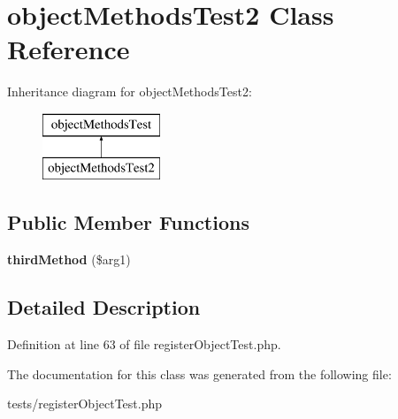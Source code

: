 \hypertarget{classobjectMethodsTest2}{
\section{objectMethodsTest2 Class Reference}
\label{classobjectMethodsTest2}
}
Inheritance diagram for objectMethodsTest2:\begin{figure}[H]
\begin{center}
\leavevmode
\includegraphics[height=2.000000cm]{classobjectMethodsTest2}
\end{center}
\end{figure}
\subsection*{Public Member Functions}
\begin{DoxyCompactItemize}
\item 
\hypertarget{classobjectMethodsTest2_af4986e03ea16b5379fda3466b9228667}{
{\bfseries thirdMethod} (\$arg1)}
\label{classobjectMethodsTest2_af4986e03ea16b5379fda3466b9228667}

\end{DoxyCompactItemize}


\subsection{Detailed Description}


Definition at line 63 of file registerObjectTest.php.



The documentation for this class was generated from the following file:\begin{DoxyCompactItemize}
\item 
tests/registerObjectTest.php\end{DoxyCompactItemize}

